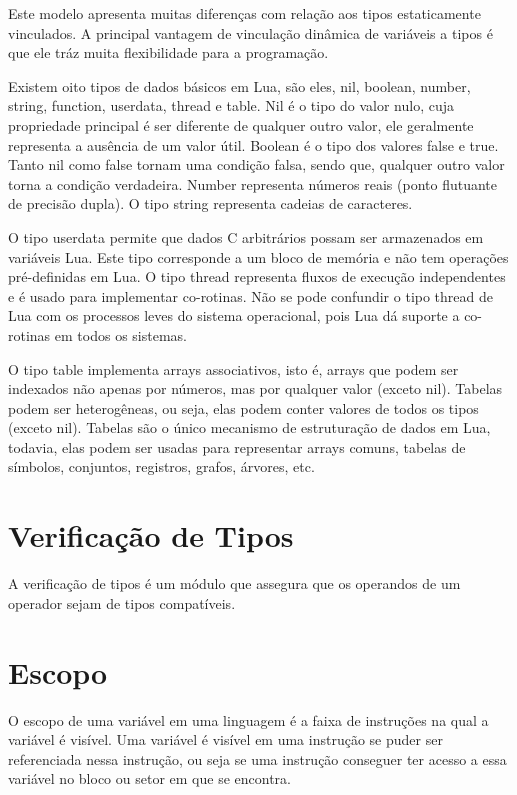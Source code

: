 \documentclass[
	12pt,				%
	openright,			%
	twoside,			%
	a4paper,			%
	english,			%
	brazil,				%
	]{abntex2}
\begin{document}
Este modelo apresenta muitas diferenças com relação aos tipos estaticamente vinculados. A principal vantagem de vinculação dinâmica de variáveis a tipos é que ele tráz muita flexibilidade para a programação.

Existem oito tipos de dados básicos em Lua, são eles, nil, boolean, number, string, function, userdata, thread e table. Nil é o tipo do valor nulo, cuja propriedade principal é ser diferente de qualquer outro valor, ele geralmente representa a ausência de um valor útil. Boolean é o tipo dos valores false e true. Tanto nil como false tornam uma condição falsa, sendo que, qualquer outro valor torna a condição verdadeira. Number representa números reais (ponto flutuante de precisão dupla). O tipo string representa cadeias de caracteres.

O tipo userdata permite que dados C arbitrários possam ser armazenados em variáveis Lua. Este tipo corresponde a um bloco de memória e não tem operações pré-definidas em Lua. O tipo thread representa fluxos de execução independentes e é usado para implementar co-rotinas. Não se pode confundir o tipo thread de Lua com os processos leves do sistema operacional, pois Lua dá suporte a co-rotinas em todos os sistemas.

O tipo table implementa arrays associativos, isto é, arrays que podem ser indexados não apenas por números, mas por qualquer valor (exceto nil). Tabelas podem ser heterogêneas, ou seja, elas podem conter valores de todos os tipos (exceto nil). Tabelas são o único mecanismo de estruturação de dados em Lua, todavia, elas podem ser usadas para representar arrays comuns, tabelas de símbolos, conjuntos, registros, grafos, árvores, etc.

\section{Verificação de Tipos}
A verificação de tipos é um módulo que assegura que os operandos de um operador sejam de tipos compatíveis.

\section{Escopo}
O escopo de uma variável em uma linguagem é a faixa de instruções na qual a variável é visível. Uma variável é visível em uma instrução se puder ser referenciada nessa instrução, ou seja se uma instrução conseguer ter acesso a essa variável no bloco ou setor em que se encontra.
\end{document}

